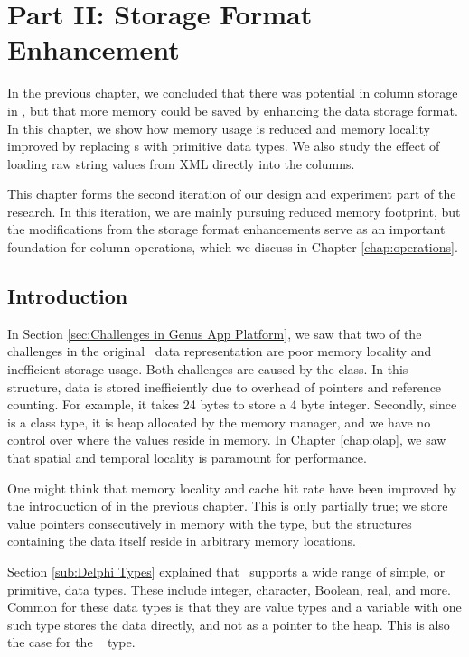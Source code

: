 \chapter{Part II: Storage Format Enhancement}
\label{chap:storage-format}
In the previous chapter, we concluded that there was potential in column storage in \gap, but that more memory could be saved by enhancing the data storage format. In this chapter, we show how memory usage is reduced and memory locality improved by replacing s with primitive data types. We also study the effect of loading raw string values from XML directly into the columns.

This chapter forms the second iteration of our design and experiment part of the research. In this iteration, we are mainly pursuing reduced memory footprint, but the modifications from the storage format enhancements serve as an important foundation for column operations, which we discuss in Chapter \ref{chap:operations}.  
\clearpage

\section{Introduction}
\label{sec:Introduction}
In Section \ref{sec:Challenges in Genus App Platform}, we saw that two of the challenges in the original \gap~data representation are poor memory locality and inefficient storage usage. Both challenges are caused by the  class. In this structure, data is stored inefficiently due to overhead of pointers and reference counting. For example, it takes 24 bytes to store a 4 byte integer. Secondly, since  is a class type, it is heap allocated by the memory manager, and we have no control over where the values reside in memory. In Chapter \ref{chap:olap}, we saw that spatial and temporal locality is paramount for performance.

One might think that memory locality and cache hit rate have been improved by the introduction of  in the previous chapter. This is only partially true; we store value pointers consecutively in memory with the  type, but the structures containing the data itself reside in arbitrary memory locations.

Section \ref{sub:Delphi Types} explained that \delphi~supports a wide range of simple, or primitive, data types. These include integer, character, Boolean, real, and more. Common for these data types is that they are value types and a variable with one such type stores the data directly, and not as a pointer to the heap. This is also the case for the \delphi~ type.


